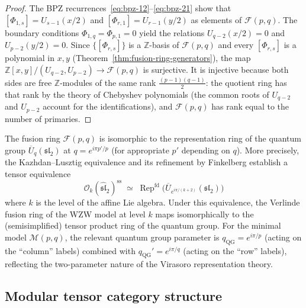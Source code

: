 \begin{proof}
The BPZ recurrences~\eqref{eq:bpz-12}--\eqref{eq:bpz-21} show that
$[\Phi_{1,s}] = U_{s-1}(x/2)$ and $[\Phi_{r,1}] = U_{r-1}(y/2)$ as elements
of $\mathcal{F}(p,q)$.  The boundary conditions $\Phi_{1,q} = \Phi_{p,1} = 0$
yield the relations $U_{q-2}(x/2) = 0$ and $U_{p-2}(y/2) = 0$.  Since
$\{[\Phi_{r,s}]\}$ is a $\mathbb{Z}$-basis of $\mathcal{F}(p,q)$ and every
$[\Phi_{r,s}]$ is a polynomial in $x, y$ (Theorem~\ref{thm:fusion-ring-generators}),
the map $\mathbb{Z}[x,y]/(U_{q-2}, U_{p-2}) \to \mathcal{F}(p,q)$ is surjective.
It is injective because both sides are free $\mathbb{Z}$-modules of the same
rank $\frac{(p-1)(q-1)}{2}$: the quotient ring has that rank by the theory of
Chebyshev polynomials (the common roots of $U_{q-2}$ and $U_{p-2}$ account
for the identifications), and $\mathcal{F}(p,q)$ has rank equal to the number
of primaries.
\end{proof}

\begin{proposition}\label{prop:fusion-quantum-group}
The fusion ring $\mathcal{F}(p,q)$ is isomorphic to the representation ring
of the quantum group $\overline{U}_q(\mathfrak{sl}_2)$ at $q = e^{i\pi p'/p}$
(for appropriate $p'$ depending on $q$).  More precisely, the
Kazhdan--Lusztig equivalence \cite{KL93} and its refinement by
Finkelberg \cite{Finkelberg96} establish a tensor equivalence
\begin{equation}\label{eq:kl-fusion}
\mathcal{O}_k(\widehat{\mathfrak{sl}}_2)^{\mathrm{ss}}
\;\simeq\; \operatorname{Rep}^{\mathrm{fd}}\!\bigl(\overline{U}_{e^{i\pi/(k+2)}}(\mathfrak{sl}_2)\bigr)
\end{equation}
where $k$ is the level of the affine Lie algebra.  Under this equivalence, the
Verlinde fusion ring of the WZW model at level $k$ maps isomorphically to the
(semisimplified) tensor product ring of the quantum group.  For the minimal model
$\mathcal{M}(p,q)$, the relevant quantum group parameter is
$q_{\mathrm{QG}} = e^{i\pi/p}$ (acting on the ``column'' labels) combined with
$q_{\mathrm{QG}}' = e^{i\pi/q}$ (acting on the ``row'' labels), reflecting the
two-parameter nature of the Virasoro representation theory.
\end{proposition}

\subsection{Modular tensor category structure}
\label{subsec:mtc-structure}

